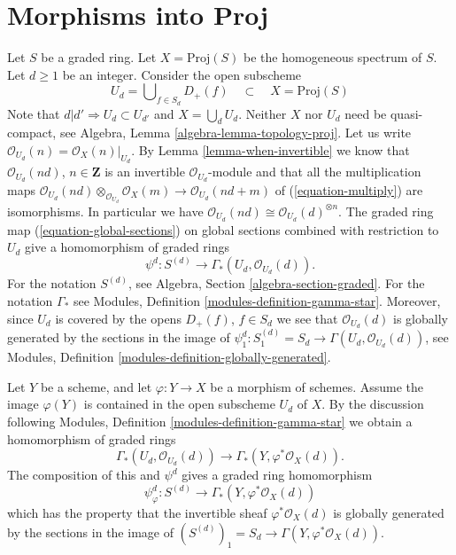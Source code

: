 \section{Morphisms into Proj}
\label{section-morphisms-proj}

\noindent
Let $S$ be a graded ring.
Let $X = \text{Proj}(S)$ be the homogeneous spectrum of $S$.
Let $d \geq 1$ be an integer.
Consider the open subscheme
\begin{equation}
\label{equation-Ud}
U_d = \bigcup\nolimits_{f  \in S_d} D_{+}(f)
\quad\subset\quad
X = \text{Proj}(S)
\end{equation}
Note that $d | d' \Rightarrow U_d \subset U_{d'}$ and
$X = \bigcup_d U_d$. Neither $X$ nor $U_d$ need
be quasi-compact, see Algebra, Lemma \ref{algebra-lemma-topology-proj}.
Let us write $\mathcal{O}_{U_d}(n) = \mathcal{O}_X(n)|_{U_d}$.
By Lemma \ref{lemma-when-invertible}
we know that $\mathcal{O}_{U_d}(nd)$, $n \in \mathbf{Z}$
is an invertible $\mathcal{O}_{U_d}$-module and
that all the multiplication maps
$\mathcal{O}_{U_d}(nd) \otimes_{\mathcal{O}_{U_d}} \mathcal{O}_X(m)
\to \mathcal{O}_{U_d}(nd + m)$ of
(\ref{equation-multiply}) are isomorphisms. In particular we have
$\mathcal{O}_{U_d}(nd) \cong \mathcal{O}_{U_d}(d)^{\otimes n}$.
The graded ring map (\ref{equation-global-sections}) on global sections
combined with restriction to $U_d$ give a homomorphism of graded rings
\begin{equation}
\label{equation-psi-d}
\psi^d : S^{(d)} \longrightarrow \Gamma_*(U_d, \mathcal{O}_{U_d}(d)).
\end{equation}
For the notation $S^{(d)}$, see Algebra, Section \ref{algebra-section-graded}.
For the notation $\Gamma_*$ see
Modules, Definition \ref{modules-definition-gamma-star}.
Moreover, since $U_d$ is covered by the opens $D_{+}(f)$, $f \in S_d$
we see that $\mathcal{O}_{U_d}(d)$ is globally generated
by the sections in the image of
$\psi^d_1 : S^{(d)}_1 = S_d \to \Gamma(U_d, \mathcal{O}_{U_d}(d))$, see
Modules, Definition \ref{modules-definition-globally-generated}.

\medskip\noindent
Let $Y$ be a scheme, and let $\varphi : Y \to X$ be a morphism of schemes.
Assume the image $\varphi(Y)$ is contained in the open subscheme
$U_d$ of $X$.
By the discussion following
Modules, Definition \ref{modules-definition-gamma-star}
we obtain a homomorphism of graded rings
$$
\Gamma_*(U_d, \mathcal{O}_{U_d}(d))
\longrightarrow
\Gamma_*(Y, \varphi^*\mathcal{O}_X(d)).
$$
The composition of this and $\psi^d$ gives a graded ring
homomorphism
\begin{equation}
\label{equation-psi-phi-d}
\psi_\varphi^d :
S^{(d)}
\longrightarrow
\Gamma_*(Y, \varphi^*\mathcal{O}_X(d))
\end{equation}
which has the property that the invertible sheaf
$\varphi^*\mathcal{O}_X(d)$ is globally generated
by the sections in the image of
$(S^{(d)})_1 = S_d \to \Gamma(Y, \varphi^*\mathcal{O}_X(d))$.


